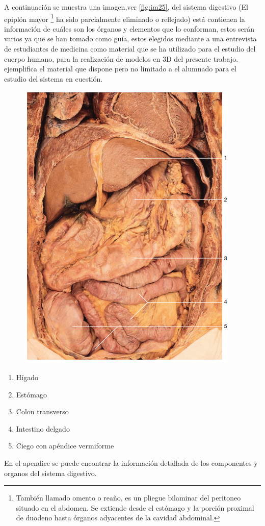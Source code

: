 A continuación se muestra una imagen,ver \ref{fig:im25}, del sistema digestivo (El epiplón mayor
\footnote{También llamado omento o reaño, es un pliegue bilaminar del peritoneo situado en el abdomen. Se extiende desde el estómago y la porción proximal de duodeno hasta órganos adyacentes de la cavidad abdominal.} 
ha sido parcialmente eliminado o reflejado)  está contienen la información de cuáles son los órganos y elementos que lo conforman, estos serán 
varios ya que se han tomado como guía, estos elegidos mediante a una entrevista de estudiantes de medicina como material que se ha utilizado para el estudio del cuerpo 
humano, para la realización de modelos en 3D del presente trabajo. ejemplifica el material que dispone pero no limitado a el alumnado para el estudio del sistema en cuestión.\\
\begin{figure}[H]
	\begin{center}
 		\includegraphics[width = .5\textwidth]{source/images/image72.png}
	\end{center} 
\end{figure}
\begin{enumerate}
	\item Hígado
	\item Estómago
	\item Colon transverso
	\item Intestino delgado
	\item Ciego con apéndice vermiforme	
\end{enumerate}
En el apendice se puede encontrar la información detallada de los componentes y organos del sistema digestivo.

